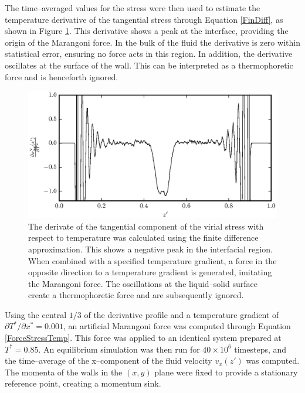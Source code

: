 The time--averaged values for the stress were then used to estimate the temperature derivative of the tangential stress through Equation \ref{FinDiff}, as shown in Figure \ref{PisVirForce}.
This derivative shows a peak at the interface, providing the origin of the Marangoni force.
In the bulk of the fluid the derivative is zero within statistical error, ensuring no force acts in this region.
In addition, the derivative oscillates at the surface of the wall.
This can be interpreted as a thermophoretic force and is henceforth ignored.

\begin{figure}[h!]
\centering
\includegraphics[scale=1.0]{PisVirForce}
\caption{The derivate of the tangential component of the virial stress with respect to temperature was calculated using the finite difference approximation.
This shows a negative peak in the interfacial region.
When combined with a specified temperature gradient, a force in the opposite direction to a temperature gradient is generated, imitating the Marangoni force.
The oscillations at the liquid--solid surface create a thermophoretic force and are subsequently ignored.}
\label{PisVirForce}
\end{figure}
\FloatBarrier

Using the central $1/3$ of the derivative profile and a temperature gradient of $\partial T^{*} / \partial x^{*} = 0.001$, an artificial Marangoni force was computed through Equation \ref{ForceStressTemp}.
This force was applied to an identical system prepared at $T^{*} = 0.85$.
An equilibrium simulation was then run for $40 \times 10^{6}$ timesteps, and the time--average of the x--component of the fluid velocity $v_{x}(z')$ was computed.
The momenta of the walls in the $\left( x,y \right)$ plane were fixed to provide a stationary reference point, creating a momentum sink.


